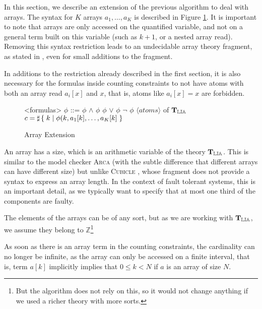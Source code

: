 
In this section, we describe an extension of the previous algorithm to
deal with arrays. The syntax for $K$ arrays $a_1, \ldots, a_K$ is
described in Figure \ref{syntaxarray}. It is important to note that
arrays are only accessed on the quantified variable, and not on a
general term built on this variable (such as $k + 1$, or a nested
array read). Removing this syntax restriction leads to an undecidable
array theory fragment, as stated in
\cite{bradley2006s}, even for small additions to the
fragment.

In additions to the restriction already described in the first section, it is also necessary for the
formulas inside counting constraints to not have atoms with both an array read $a_i[x]$ and $x$,
that is, atoms like $a_i[x] = x$ are forbidden.

\begin{figure}[h]
\begin{grammar}

<formulas> $\phi$ ::= $\phi$ $\land$ $\phi$
\alt $\phi$ $\lor$ $\phi$
\alt $\lnot$ $\phi$
\alt $\langle atoms\rangle$ of $\operatorname{\mathbf{T}_{\mathbb{LIA}}}$
\alt $c = \sharp\left\lbrace\;k\;|\;\phi(k, a_1[k], \ldots, a_K[k]\;\right\rbrace$

\end{grammar}
\caption{Array Extension}
\label{syntaxarray}
\end{figure}


An array has a size, which is an arithmetic variable of the theory
$\operatorname{\mathbf{T}_{\mathbb{LIA}}}$. This is similar to the model checker \textsc{Arca}
\cite{AlbertiGP16} (with the subtle difference that
different arrays can have different size) but unlike \textsc{Cubicle}
\cite{ConchonGKMZ12}, whose fragment does not
provide a syntax to express an array length. In the context of fault
tolerant systems, this is an important detail, as we typically want to
specify that at most one third of the components are faulty.

The elements of the arrays can be of any sort, but as we are working with
$\operatorname{\mathbf{T}_{\mathbb{LIA}}}$, we assume they belong to $\mathbb{Z}$\footnote{But the algorithm does
not rely on this, so it would not change anything if we used a richer theory with
more sorts.}

As soon as there is an array term in the counting constraints, the
cardinality can no longer be infinite, as the array can only be accessed
on a finite interval, that is, term $a[k]$ implicitly implies that $0 \le k < N$ if $a$ is an array of size $N$.

